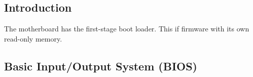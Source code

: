 

\subsection{Introduction}

The motherboard has the first-stage boot loader. This if firmware with its own read-only memory.

\subsection{Basic Input/Output System (BIOS)}

